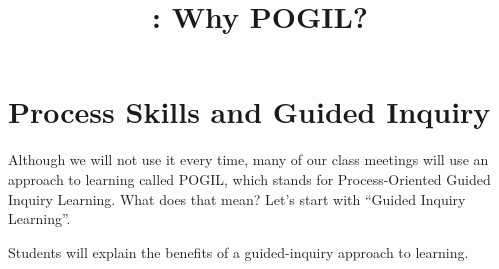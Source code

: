 \documentclass{tufte-handout}
\title{\thecourse: Why POGIL?}
\date{}
\begin{document}
\maketitle

\section{Process Skills and Guided Inquiry}

Although we will not use it every time, many of our class meetings
will use an approach to learning called POGIL, which stands for
Process-Oriented Guided Inquiry Learning.  What does that mean?  Let's
start with ``Guided Inquiry Learning''.

\begin{objective}
  Students will explain the benefits of a guided-inquiry approach to
  learning.
\end{objective}
\end{document}
